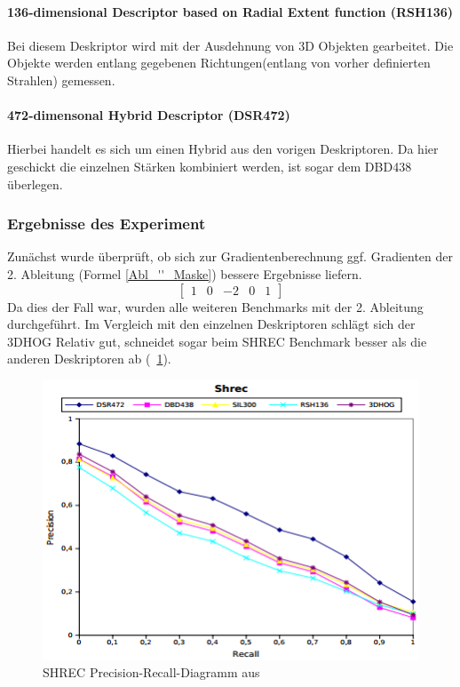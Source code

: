 \paragraph{136-dimensional Descriptor based on Radial Extent function (RSH136) }
Bei diesem Deskriptor wird mit der Ausdehnung von 3D Objekten gearbeitet. Die Objekte werden entlang gegebenen Richtungen(entlang von vorher definierten Strahlen) gemessen.

\paragraph{472-dimensonal Hybrid Descriptor (DSR472) }
Hierbei handelt es sich um einen Hybrid aus den vorigen Deskriptoren. Da hier geschickt die einzelnen Stärken kombiniert werden, ist sogar dem DBD438 überlegen.

\subsubsection{Ergebnisse des Experiment}
Zunächst wurde überprüft, ob sich zur Gradientenberechnung ggf. Gradienten der 2. Ableitung (Formel \ref{Abl_''_Maske}) bessere Ergebnisse liefern.    
\begin{equation}
\label{Abl_''_Maske}
\begin{bmatrix}
1 & 0 & -2 & 0 & 1
\end{bmatrix}
\end{equation}
Da dies der Fall war, wurden alle weiteren Benchmarks mit der 2. Ableitung durchgeführt. Im Vergleich mit den einzelnen Deskriptoren schlägt sich der 3DHOG Relativ gut, schneidet sogar beim SHREC Benchmark besser als die anderen Deskriptoren ab (\figurename~\ref{Shrec_diag}).

 \begin{figure}[thpb]
 	\centering
 	\includegraphics[width=\linewidth]{2-Hauptteil/pics/SHREC_diag.png}
 	\caption{SHREC Precision-Recall-Diagramm aus \cite{scherer2010histograms}}
 	\label{Shrec_diag}
 \end{figure}
 
